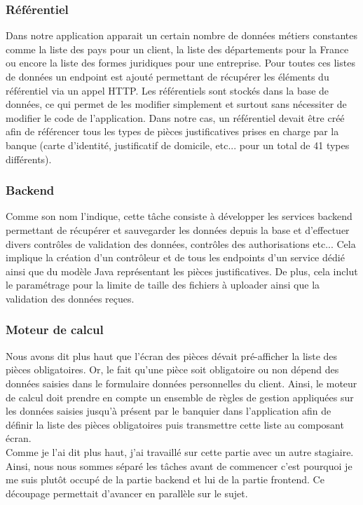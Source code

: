 	\subsubsection{Référentiel}
	Dans notre application apparait un certain nombre de données métiers constantes comme la liste des pays pour un client, la liste des départements pour la France ou encore la liste des formes juridiques pour une entreprise. Pour toutes ces listes de données un endpoint est ajouté permettant de récupérer les éléments du référentiel via un appel HTTP. Les référentiels sont stockés dans la base de données, ce qui permet de les modifier simplement et surtout sans nécessiter de modifier le code de l'application. Dans notre cas, un référentiel devait être créé afin de référencer tous les types de pièces justificatives prises en charge par la banque (carte d'identité, justificatif de domicile, etc... pour un total de 41 types différents).	
	
	\subsubsection{Backend}
	Comme son nom l'indique, cette tâche consiste à développer les services backend permettant de récupérer et sauvegarder les données depuis la base et d'effectuer divers contrôles de validation des données, contrôles des authorisations etc... Cela implique la création d'un contrôleur et de tous les endpoints d'un service dédié ainsi que du modèle Java représentant les pièces justificatives. De plus, cela inclut le paramétrage pour la limite de taille des fichiers à uploader ainsi que la validation des données reçues.
	
	\subsubsection{Moteur de calcul}
	Nous avons dit plus haut que l'écran des pièces dévait pré-afficher la liste des pièces obligatoires. Or, le fait qu'une pièce soit obligatoire ou non dépend des données saisies dans le formulaire données personnelles du client. Ainsi, le moteur de calcul doit prendre en compte un ensemble de règles de gestion appliquées sur les données saisies jusqu'à présent par le banquier dans l'application afin de définir la liste des pièces obligatoires puis transmettre cette liste au composant écran. \\
	
	Comme je l'ai dit plus haut, j'ai travaillé sur cette partie avec un autre stagiaire. Ainsi, nous nous sommes séparé les tâches avant de commencer c'est pourquoi je me suis plutôt occupé de la partie backend et lui de la partie frontend. Ce découpage permettait d'avancer en parallèle sur le sujet. \\
	
